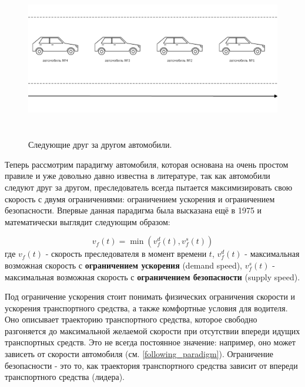 \documentclass[12pt, a4paper]{extarticle}
\numberwithin{equation}{section}
\begin{document}
\begin{figure}[h!]  
	\begin{center}
		\includegraphics[keepaspectratio,width=160mm,height=70mm]{Images/car_following.png}
	\end{center}
	\caption{Следующие друг за другом автомобили.}
	\label{car_following}
\end{figure}

Теперь рассмотрим парадигму автомобиля, которая основана на очень простом правиле и уже довольно давно известна в литературе, так как автомобили следуют друг за другом, преследователь всегда пытается максимизировать свою скорость с двумя ограничениями: ограничением ускорения и ограничением безопасности. Впервые данная парадигма была высказана ещё в 1975 \cite{GippsModel} и математически выглядит следующим образом:

\begin{equation} \label{following_paradigm}
v_f(t) = \min(v_f^d(t), v_f^s(t))
\end{equation}
где $v_f(t)$ - скорость преследователя в момент времени $t$, $v_f^d(t)$ - максимальная возможная скорость с \textbf{ограничением ускорения} (demand speed), $v_f^s(t)$ - максимальная возможная скорость с \textbf{ограничением безопасности} (supply speed).

Под ограничение ускорения стоит понимать физических ограничения скорости и ускорения транспортного средства, а также комфортные условия для водителя. Оно описывает траекторию транспортного средства, которое свободно разгоняется до максимальной желаемой скорости при отсутствии впереди идущих транспортных средств. Это не всегда постоянное значение: например, оно может зависеть от скорости автомобиля (см. \ref{following_paradigm}). Ограничение безопасности - это то, как траектория транспортного средства зависит от впереди транспортного средства (лидера).
\end{document}
